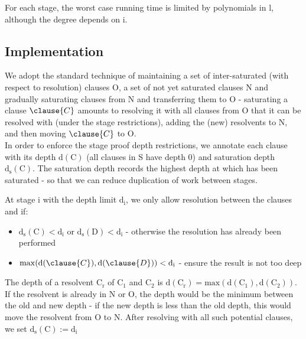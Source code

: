 For each stage, the worst case running time is limited by polynomials in $\mathrm{l}$, although the degree depends on $\mathrm{i}$.

\subsection*{Implementation}
We adopt the standard technique of maintaining a set of inter-saturated (with respect to resolution) clauses $\mathrm{O}$, a set of not yet saturated clauses $\mathrm{N}$ and gradually saturating clauses from $\mathrm{N}$ and transferring them to $\mathrm{O}$ - saturating a clause $\clause{C}$ amounts to resolving it with all clauses from $\mathrm{O}$ that it can be resolved with (under the stage restrictions), adding the (new) resolvents to $\mathrm{N}$, and then moving $\clause{C}$ to $\mathrm{O}$.\\
\noindent
In order to enforce the stage proof depth restrictions, we annotate each clause  with its depth $\mathrm{d}(\mathrm{C})$ (all clauses in $\mathrm{S}$ have depth 0) and saturation depth $\mathrm{d_s}(\mathrm{C})$.
The saturation depth records the highest depth at which  has been saturated - so that we can reduce duplication of work between stages.

\noindent
At stage $\mathrm{i}$ with the depth limit $\mathrm{d_i}$, we only allow resolution between the clauses  and  if:
\begin{itemize}
	\item $\mathrm{d_s}(\mathrm{C})<\mathrm{d_i}$ or $\mathrm{d_s}(\mathrm{D})<\mathrm{d_i}$ - otherwise the resolution has already been performed
	\item $\mathrm{max}(\mathrm{d}(\clause{C}),\mathrm{d}(\clause{D}))<\mathrm{d_i}$  - ensure the result is not too deep
\end{itemize}

The depth of a resolvent $\mathrm{C}_\mathrm{r}$ of $\mathrm{C}_1$ and $\mathrm{C}_2$ is $\mathrm{d}(\mathrm{C}_\mathrm{r}) = \mathrm{max}(\mathrm{d}(\mathrm{C}_1),\mathrm{d}(\mathrm{C}_2))$. 
If the resolvent is already in $\mathrm{N}$ or $\mathrm{O}$, the depth would be the minimum between the old and new depth - if the new depth is less than the old depth, this would move the resolvent from $\mathrm{O}$ to $\mathrm{N}$.
After resolving  with all such potential clauses, we set $\mathrm{d_s}(\mathrm{C}) := \mathrm{d_i}$ 

